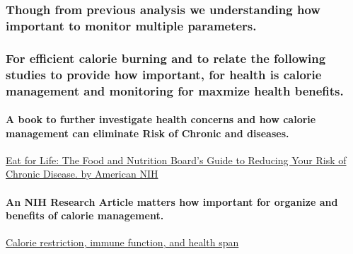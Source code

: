 \documentclass[
]{article}
\begin{document}
\subsubsection{Though from previous analysis we understanding how
important to monitor multiple
parameters.}\label{though-from-previous-analysis-we-understanding-how-important-to-monitor-multiple-parameters.}

\subsubsection{For efficient calorie burning and to relate the following
studies to provide how important, for health is calorie management and
monitoring for maxmize health
benefits.}\label{for-efficient-calorie-burning-and-to-relate-the-following-studies-to-provide-how-important-for-health-is-calorie-management-and-monitoring-for-maxmize-health-benefits.}

\paragraph{A book to further investigate health concerns and how calorie
management can eliminate Risk of Chronic and
diseases.}\label{a-book-to-further-investigate-health-concerns-and-how-calorie-management-can-eliminate-risk-of-chronic-and-diseases.}

\href{https://www.ncbi.nlm.nih.gov/books/NBK235013/}{Eat for Life: The
Food and Nutrition Board's Guide to Reducing Your Risk of Chronic
Disease. by American NIH}

\paragraph{An NIH Research Article matters how important for organize
and benefits of calorie
management.}\label{an-nih-research-article-matters-how-important-for-organize-and-benefits-of-calorie-management.}

\href{https://www.nih.gov/news-events/nih-research-matters/calorie-restriction-immune-function-health-span}{Calorie
restriction, immune function, and health span}
\end{document}
